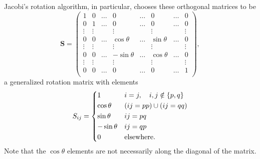 \documentclass[aps,prc,reprint]{revtex4-1}
\begin{document}
        Jacobi's rotation algorithm, in particular, chooses these orthogonal matrices to be
        \begin{equation}
            \mathbf{S} = \begin{pmatrix}
                1      & 0      & \dots  & 0           & \dots &  0         & \dots & 0\\
                0      & 1      & \dots  & 0           & \dots &  0         & \dots & 0\\
                \vdots & \vdots &        & \vdots      &       & \vdots     &       & \vdots \\
                0      & 0      & \dots  & \cos\theta  & \dots & \sin\theta & \dots & 0\\
                \vdots & \vdots &        & \vdots      &       & \vdots     &       & \vdots \\
                0      & 0      & \dots  & -\sin\theta & \dots & \cos\theta & \dots & 0 \\
                \vdots & \vdots &        & \vdots      &       & \vdots     &       & \vdots \\
                0      & 0      & \dots  & 0           & \dots & 0          & \dots & 1 \\

            \end{pmatrix},
        \end{equation}
        a generalized rotation matrix with elements
        \begin{equation*}
            S_{ij} = \begin{dcases}
                1           & i=j,\quad i,j \notin \{p,q\}  \\
                \cos\theta  & (ij=pp) \cup (ij=qq) \\
                \sin\theta  & ij=pq \\
                -\sin\theta & ij=qp \\
                0           & \text{elsewhere}.
            \end{dcases}
        \end{equation*}
        Note that the $\cos\theta$ elements are not necessarily along the diagonal of the matrix.
\end{document}
